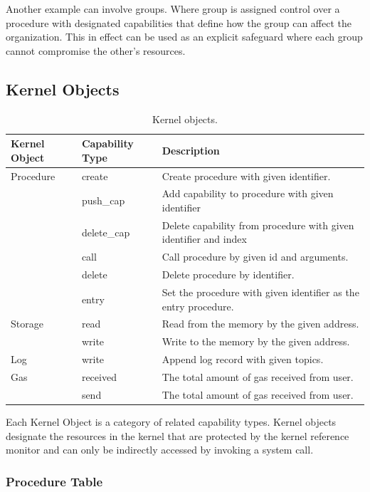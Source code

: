 \documentclass[english,a4paper]{article}
\let\oldparagraph\subsubsection
\renewcommand{\subsubsection}[1]{\oldparagraph{#1}\mbox{}}
\begin{document}
Another example can involve groups. Where group is assigned control over
a procedure with designated capabilities that define how the group can
affect the organization. This in effect can be used as an explicit
safeguard where each group cannot compromise the other's resources.

\subsection{Kernel Objects}\label{kernel-objects}

\begin{table}[H]
    \caption{Kernel objects.}
    \centering{}%
    \begin{tabular}{l|l|p{}}


        \hline
        Kernel Object & Capability Type & Description\tabularnewline
        \hline
        \hline
        Procedure & create & Create procedure with given
        identifier.\tabularnewline
        & push\_cap & Add capability to procedure with given
        identifier\tabularnewline
        & delete\_cap & Delete capability from procedure with given identifier
        and index\tabularnewline
        & call & Call procedure by given id and arguments.\tabularnewline
        & delete & Delete procedure by identifier.\tabularnewline
        & entry & Set the procedure with given identifier as the entry
        procedure.\tabularnewline
        \hline
        Storage & read & Read from the memory by the given
        address.\tabularnewline
        & write & Write to the memory by the given address.\tabularnewline
        \hline
        Log & write & Append log record with given topics.\tabularnewline
        \hline
        Gas & received & The total amount of gas received from
        user.\tabularnewline
        & send & The total amount of gas received from user.\tabularnewline
        \hline
    \end{tabular}
\end{table}

Each Kernel Object is a category of related capability types. Kernel
objects designate the resources in the kernel that are protected by the
kernel reference monitor and can only be indirectly accessed by invoking
a system call.

\subsubsection{Procedure Table}\label{procedure-table}
\end{document}
